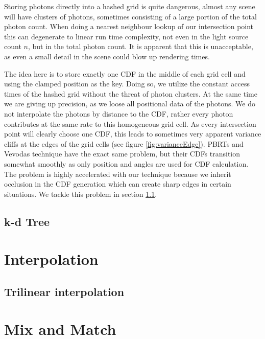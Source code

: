 Storing photons directly into a hashed grid is quite dangerous, almost any scene will have clusters of photons, sometimes consisting of a large portion of the total photon count. When doing a nearest neighbour lookup of our intersection point this can degenerate to linear run time complexity, not even in the light source count $n$, but in the total photon count. It is apparent that this is unacceptable, as even a small detail in the scene could blow up rendering times.

The idea here is to store exactly one CDF in the middle of each grid cell and using the clamped position as the key. Doing so, we utilize the constant access times of the hashed grid without the threat of photon clusters. At the same time we are giving up precision, as we loose all positional data of the photons. We do not interpolate the photons by distance to the CDF, rather every photon contributes at the same rate to this homogeneous grid cell. As every intersection point will clearly choose one CDF, this leads to sometimes very apparent variance cliffs at the edges of the grid cells (see figure \ref{fig:varianceEdge}). PBRTs \cite{pbrt} and Vevodas \cite{Vevoda}  technique have the exact same problem, but their CDFs transition somewhat smoothly as only position and angles are used for CDF calculation. The problem is highly accelerated with our technique because we inherit occlusion in the CDF generation which can create sharp edges in certain situations. We tackle this problem in section \ref{ch:trilinear}.


\subsection{k-d Tree}
\label{sec:pneekdtree}

\section{Interpolation}

\subsection{Trilinear interpolation}
\label{ch:trilinear}




\section{Mix and Match}

